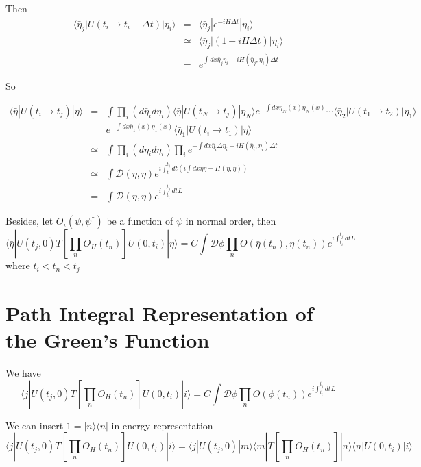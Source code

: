 \documentclass[12pt]{book}
\begin{document}
	Then
	\begin{eqnarray}
		\langle\bar\eta_j|U(t_i\rightarrow t_i+\Delta t)|\eta_i\rangle&=&\langle\bar\eta_j|e^{-iH\Delta t}|\eta_i\rangle\\
		&\simeq&\langle\bar\eta_j|(1-iH\Delta t)|\eta_i\rangle\\
		&=&e^{\int dx\bar\eta_j\eta_i-iH(\bar\eta_j,\eta_i)\Delta t}
	\end{eqnarray}
	
	So
	
	\begin{eqnarray}
		\langle \bar\eta|U(t_i\rightarrow t_j)|\eta\rangle&=&\int\prod_i(d\bar\eta_id\eta_i) \langle \bar\eta|U(t_N\rightarrow t_j)|\eta_N\rangle e^{-\int dx\bar\eta_N(x)\eta_N(x)}\cdots \langle \bar\eta_2|U(t_1 \rightarrow t_2)|\eta_1\rangle\nonumber\\
		 &&e^{-\int dx\bar\eta_1(x)\eta_1(x)}\langle \bar\eta_1|U(t_i \rightarrow t_1)|\eta\rangle\\
		&\simeq&\int\prod_i(d\bar\eta_id\eta_i)\prod_ie^{-\int dx\bar\eta_i\Delta\eta_i-iH(\bar\eta_i,\eta_i)\Delta t}\\
		&\simeq&\int \mathcal D(\bar\eta,\eta)e^{i\int_{t_i}^{t_j}dt(i\int dx\bar\eta\dot\eta-H(\bar\eta,\eta))}\\
		&=&\int \mathcal D(\bar\eta,\eta)e^{i\int_{t_i}^{t_j}dtL}
	\end{eqnarray}
	
	Besides, let $O_i(\psi,\psi^\dagger)$ be a function of $\psi$ in normal order, then
	\begin{equation}
		\langle \bar\eta|U(t_j,0)T[\prod_nO_H(t_n)]U(0,t_i)|\eta\rangle=C\int \mathcal D \phi\prod_n O(\bar\eta(t_n),\eta(t_n))e^{i\int_{t_i}^{t_j}dtL}
	\end{equation}
	where $t_i<t_n<t_j$
	
	\section{Path Integral Representation of the Green's Function}
	
	
	We have
	\begin{equation}
		\langle j|U(t_j,0)T[\prod_nO_H(t_n)]U(0,t_i)|i\rangle=C\int \mathcal D \phi\prod_n O(\phi(t_n))e^{i\int_{t_i}^{t_j}dtL}
	\end{equation}
	
	We can insert $1=|n\rangle\langle n|$ in energy representation
	\begin{equation}
		\langle j|U(t_j,0)T[\prod_nO_H(t_n)]U(0,t_i)|i\rangle=\langle j|U(t_j,0)|m\rangle\langle m|T[\prod_nO_H(t_n)]|n\rangle\langle n|U(0,t_i)|i\rangle
	\end{equation}
	
\end{document}
